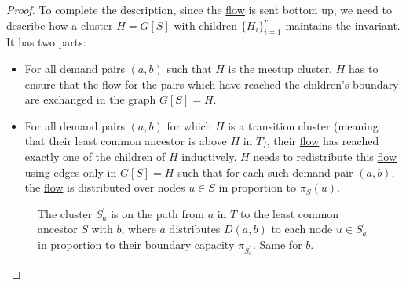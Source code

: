 \begin{proof}
	To complete the description, since the \hyperref[def:flow]{flow} is sent bottom up, we need to describe how a cluster \(H= G[S]\) with children \(\{ H_i \} _{i=1}^{r}\) maintains the invariant. It has two parts:
	\begin{itemize}
		\item For all demand pairs \((a, b)\) such that \(H\) is the meetup cluster, \(H\) has to ensure that the \hyperref[def:flow]{flow} for the pairs which have reached the children's boundary are exchanged in the graph \(G[S] = H\).
		\item For all demand pairs \((a, b)\) for which \(H\) is a transition cluster (meaning that their least common ancestor is above \(H\) in \(T\)), their \hyperref[def:flow]{flow} has reached exactly one of the children of \(H\) inductively. \(H\) needs to redistribute this \hyperref[def:flow]{flow} using edges only in \(G[S] = H\) such that for each such demand pair \((a, b)\), the \hyperref[def:flow]{flow} is distributed over nodes \(u \in S\) in proportion to \(\pi _S(u)\).
	\end{itemize}
	\begin{figure}[H]
		\centering
		\caption{The cluster \(S^{\prime} _a\) is on the path from \(a\) in \(T\) to the least common ancestor \(S\) with \(b\), where \(a\) distributes \(D(a, b)\) to each node \(u \in S^{\prime} _a\) in proportion to their boundary capacity \(\pi _{S^{\prime} _a}\). Same for \(b\).}
		\label{fig:hierarchical-expander-decomposition-characterization}
	\end{figure}


\end{proof}

